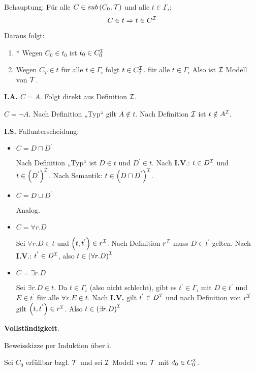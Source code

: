 Behauptung: Für alle $C \in sub\left( C_{0},\mathcal{T} \right)$ und alle
$t \in \Gamma_{i}$:
$$C \in t \Rightarrow t \in C^{\mathcal{I}}$$

Daraus folgt:

\begin{enumerate}
\def\labelenumi{\arabic{enumi}.}
\item
  * Wegen $C_{0} \in t_{0}$ ist $t_{0} \in C_{0}^{\mathcal{I}}$
\item
  Wegen $C_{T} \in t$ für alle $t \in \Gamma_{i}$ folgt
  $t \in C_{T}^{\mathcal{I}}$. für alle $t \in \Gamma_{i}$ Also ist $\mathcal{I}$ Modell von $\mathcal{T}$.
\end{enumerate}

\textbf{I.A.} $C = A$. Folgt direkt aus Definition $\mathcal{I}$.

$C = \neg A$. Nach Definition „Typ`` gilt $A \notin t$. Nach
Definition $\mathcal{I}$ ist $t \notin A^{\mathcal{I}}$.

\textbf{I.S.} Fallunterscheidung:

\begin{itemize}
\item
  $C = D \sqcap D^{'}$

Nach Definition „Typ`` ist $D \in t$ und $D^{'} \in t$. Nach
\textbf{I.V}.: $t \in D^{\mathcal{I}}$ und $t \in \left( D^{'} \right)^{\mathcal{I}}$.
Nach Semantik: $t \in \left( D \sqcap D^{'} \right)^{\mathcal{I}}$.

\item
  $C = D \sqcup D^{'}$

Analog.

\item
  $C = \forall r.D$

Sei $\forall r.D \in t$ und $\left( t,t^{'} \right) \in r^{\mathcal{I}}$. Nach
Definition $r^{\mathcal{I}}$ muss $D \in t^{'}$ gelten. Nach \textbf{I.V}.:
$t^{'} \in D^{\mathcal{I}}$, also $t \in \left( \forall r.D \right)^{\mathcal{I}}$

\item
  $C = \exists r.D$

Sei $\exists r.D \in t$. Da $t \in \Gamma_{i}$ (also nicht
schlecht), gibt es $t^{'} \in \Gamma_{i}$ mit $D \in t^{'}$ und
$E \in t^{'}$ für alle $\forall r.E \in t$. Nach \textbf{I.V.} gilt
$t^{'} \in D^{\mathcal{I}}$ und nach Definition von $r^{\mathcal{I}}$ gilt
$\left( t,t^{'} \right) \in r^{\mathcal{I}}$. Also
$t \in \left( \exists r.D \right)^{\mathcal{I}}$
\end{itemize}

\textbf{Vollständigkeit}. 

Beweisskizze per Induktion über i.

Sei $C_{0}$ erfüllbar bzgl. $\mathcal{T}$ und sei $\mathcal{I}$ Modell von $\mathcal{T}$ mit
$d_{0} \in C_{0}^{\mathcal{I}}$. 

